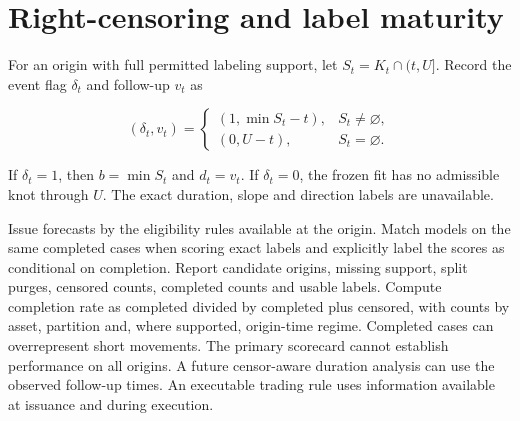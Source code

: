\documentclass[10pt,letterpaper]{article}
\begin{document}
\section{Right-censoring and label maturity}

For an origin with full permitted labeling support, let \(S_t=K_t\cap(t,U]\). Record the event flag \(\delta_t\) and follow-up \(v_t\) as

\[
(\delta_t,v_t)=
\begin{cases}
(1,\min S_t-t), & S_t\neq\varnothing,\\
(0,U-t), & S_t=\varnothing.
\end{cases}
\]

If \(\delta_t=1\), then \(b=\min S_t\) and \(d_t=v_t\). If \(\delta_t=0\), the frozen fit has no admissible knot through \(U\). The exact duration, slope and direction labels are unavailable.\par

\par{}\par\smallskip

Issue forecasts by the eligibility rules available at the origin. Match models on the same completed cases when scoring exact labels and explicitly label the scores as conditional on completion. Report candidate origins, missing support, split purges, censored counts, completed counts and usable labels. Compute completion rate as completed divided by completed plus censored, with counts by asset, partition and, where supported, origin-time regime. Completed cases can overrepresent short movements. The primary scorecard cannot establish performance on all origins. A future censor-aware duration analysis can use the observed follow-up times. An executable trading rule uses information available at issuance and during execution.\par
\end{document}
